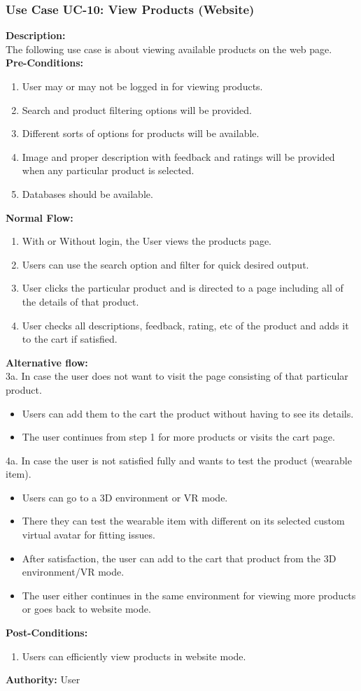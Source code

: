 \subsubsection{Use Case UC-10: View Products (Website)}
\textbf{Description:}\\
The following use case is about viewing available products on the web page. 
\\
\textbf{Pre-Conditions:}
\begin{enumerate}
    \item User may or may not be logged in for viewing products.
 \item Search and product filtering options will be provided. 
 \item Different sorts of options for products will be available.
 \item Image and proper description with feedback and ratings will be provided when any particular product is selected.
 \item Databases should be available. \end{enumerate}
\textbf{Normal Flow:}\\
\begin{enumerate}
\item With or Without login, the User views the products page. 
\item Users can use the search option and filter for quick desired output. 
\item User clicks the particular product and is directed to a page including all of the details of that product. 
\item User checks all descriptions, feedback, rating, etc of the product and adds it to the cart if satisfied. 
\end{enumerate}
\textbf{Alternative flow:} \\
3a. In case the user does not want to visit the page consisting of that particular product. 
\begin{itemize}
    \item Users can add them to the cart the product without having to see its details.
    \item The user continues from step 1 for more products or visits the cart page.
\end{itemize}
4a. In case the user is not satisfied fully and wants to test the product (wearable item).
\begin{itemize}
    \item Users can go to a 3D environment or VR mode.
    \item There they can test the wearable item with different on its selected custom virtual avatar for fitting issues.
  \item 	After satisfaction, the user can add to the cart that product from the 3D environment/VR mode.
 \item  The user either continues in the same environment for viewing more products or goes back to website mode.
\end{itemize}
\textbf{Post-Conditions: }
\begin{enumerate}
\item	Users can efficiently view products in website mode.
\end{enumerate}
\textbf{Authority:}
User

